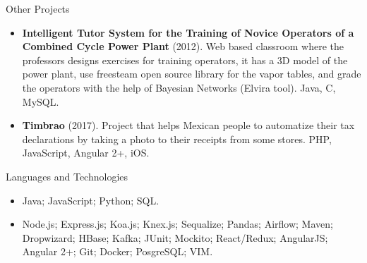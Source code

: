 \documentclass[calibri]{../macdowell-cv/mcdowellcv}
\begin{document}
	\begin{cvsection}{Other Projects}
		\begin{cvsubsection}{}{}{}	
			\begin{itemize}
				\item \textbf{Intelligent Tutor System for the Training of Novice Operators of a Combined Cycle Power Plant} (2012). Web based classroom where the professors designs exercises for training operators, it has a 3D model of the power plant, use freesteam open source library for the vapor tables, and grade the operators with the help of Bayesian Networks (Elvira tool). Java, C, MySQL.
				\item \textbf{Timbrao} (2017). Project that helps Mexican people to automatize their tax declarations by taking a photo to their receipts from some stores.  PHP, JavaScript, Angular 2+, iOS.
			\end{itemize}
		\end{cvsubsection}
	\end{cvsection}
	
	\begin{cvsection}{Languages and Technologies}
		\begin{cvsubsection}{}{}{}	
			\begin{itemize}
				\item Java; JavaScript; Python; SQL.
				\item Node.js; Express.js; Koa.js; Knex.js; Sequalize; Pandas; Airflow; Maven; Dropwizard; HBase; Kafka; JUnit; Mockito; React/Redux; AngularJS; Angular 2+; Git; Docker; PosgreSQL; VIM.
			\end{itemize}
		\end{cvsubsection}
	\end{cvsection}
	
\end{document}
